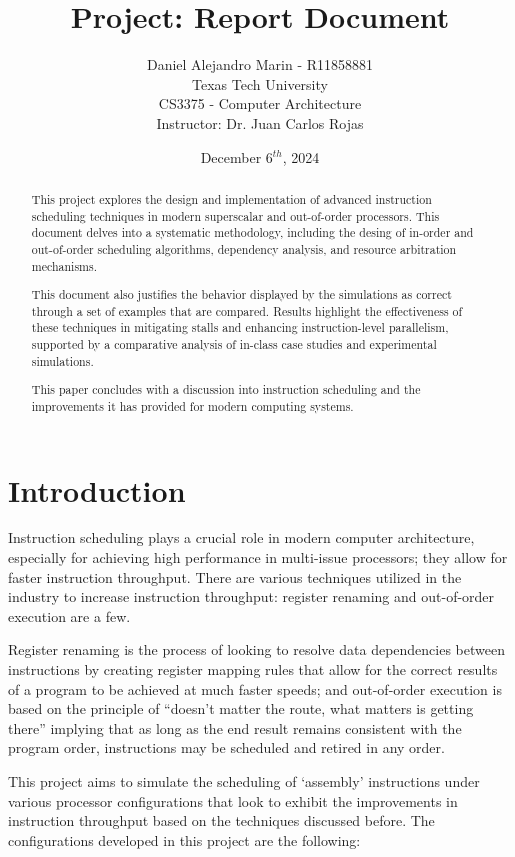 \documentclass{article}
\title{Project: Report Document}
\author{Daniel Alejandro Marin - R11858881\\
    \small Texas Tech University \\
    \small CS3375 - Computer Architecture \\ 
    \small Instructor: Dr. Juan Carlos Rojas}
\date{December 6$^{th}$, 2024}
\begin{document}
\maketitle
\begin{abstract}
    This project explores the design and implementation of advanced instruction scheduling techniques in modern superscalar and out-of-order processors. This document delves into a systematic methodology, including the desing of in-order and out-of-order scheduling algorithms, dependency analysis, and resource arbitration mechanisms. 
    
    This document also justifies the behavior displayed by the simulations as correct through a set of examples that are compared. Results highlight the effectiveness of these techniques in mitigating stalls and enhancing instruction-level parallelism, supported by a comparative analysis of in-class case studies and experimental simulations.
    
    This paper concludes with a discussion into instruction scheduling and the improvements it has provided for modern computing systems.
\end{abstract}

\tableofcontents

\newpage

\section{Introduction}
Instruction scheduling plays a crucial role in modern computer architecture, especially for achieving high performance in multi-issue processors; they allow for faster instruction throughput. There are various techniques utilized in the industry to increase instruction throughput: register renaming and out-of-order execution are a few. 

Register renaming is the process of looking to resolve data dependencies between instructions by creating register mapping rules that allow for the correct results of a program to be achieved at much faster speeds; and out-of-order execution is based on the principle of ``doesn't matter the route, what matters is getting there'' implying that as long as the end result remains consistent with the program order, instructions may be scheduled and retired in any order. 

This project aims to simulate the scheduling of `assembly' instructions under various processor configurations that look to exhibit the improvements in instruction throughput based on the techniques discussed before. The configurations developed in this project are the following:
\end{document}
